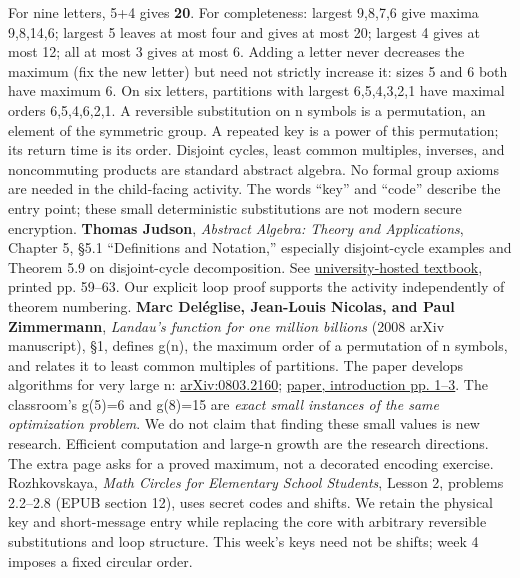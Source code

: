 \documentclass[12pt]{extarticle}
\begin{document}
For nine letters, 5+4 gives \textbf{20}. For completeness: largest 9,8,7,6 give maxima 9,8,14,6; largest 5 leaves at most four and gives at most 20; largest 4 gives at most 12; all at most 3 gives at most 6. Adding a letter never decreases the maximum (fix the new letter) but need not strictly increase it: sizes 5 and 6 both have maximum 6. On six letters, partitions with largest 6,5,4,3,2,1 have maximal orders 6,5,4,6,2,1.
\newpage
{}
A reversible substitution on n symbols is a permutation, an element of the symmetric group. A repeated key is a power of this permutation; its return time is its order. Disjoint cycles, least common multiples, inverses, and noncommuting products are standard abstract algebra. No formal group axioms are needed in the child-facing activity. The words ``key'' and ``code'' describe the entry point; these small deterministic substitutions are not modern secure encryption.
\textbf{Thomas Judson}, \emph{Abstract Algebra: Theory and Applications}, Chapter 5, \S5.1 ``Definitions and Notation,'' especially disjoint-cycle examples and Theorem 5.9 on disjoint-cycle decomposition. See \href{https://people.hsc.edu/faculty-staff/blins/books/JudsonAbstractAlgebra.pdf}{university-hosted textbook}, printed pp. 59--63. Our explicit loop proof supports the activity independently of theorem numbering.
\textbf{Marc Del\'eglise, Jean-Louis Nicolas, and Paul Zimmermann}, \emph{Landau's function for one million billions} (2008 arXiv manuscript), \S1, defines g(n), the maximum order of a permutation of n symbols, and relates it to least common multiples of partitions. The paper develops algorithms for very large n: \href{https://arxiv.org/abs/0803.2160}{arXiv:0803.2160}; \href{https://arxiv.org/pdf/0803.2160}{paper, introduction pp. 1--3}.
The classroom's g(5)=6 and g(8)=15 are \emph{exact small instances of the same optimization problem}. We do not claim that finding these small values is new research. Efficient computation and large-n growth are the research directions. The extra page asks for a proved maximum, not a decorated encoding exercise.
Rozhkovskaya, \emph{Math Circles for Elementary School Students}, Lesson 2, problems 2.2--2.8 (EPUB section 12), uses secret codes and shifts. We retain the physical key and short-message entry while replacing the core with arbitrary reversible substitutions and loop structure. This week's keys need not be shifts; week 4 imposes a fixed circular order.
\end{document}
